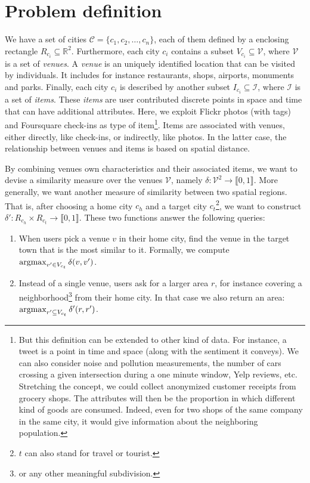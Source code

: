 \section{Problem definition}
\label{sec:problem}

We have a set of cities $\mathcal{C} =
\{c_1, c_2, \ldots, c_n\}$, each of them defined by a enclosing rectangle
$R_{c_i} \subseteq \mathbb{R}^2$. Furthermore, each city $c_i$ contains a
subset $V_{c_i} \subseteq \mathcal{V}$, where $\mathcal{V}$ is a set of
\emph{venues}. A \emph{venue} is an uniquely identified location that can be
visited by individuals. It includes for instance restaurants, shops, airports,
monuments and parks. Finally, each city $c_i$ is described by another subset
$I_{c_i} \subseteq \mathcal{I}$, where $\mathcal{I}$ is a set of \emph{items}.
These \emph{items} are user contributed discrete points in space and time that
can have additional attributes. Here, we exploit Flickr photos (with tags) and
Foursquare check-ins as type of item\footnote{But this definition can be
    extended to other kind of data. For instance, a tweet is a point in time
    and space (along with the sentiment it conveys). We can also consider
    noise and pollution measurements, the number of cars crossing a given
    intersection during a one minute window, Yelp reviews, etc. Stretching the
    concept, we could collect anonymized customer receipts from grocery shops.
    The attributes will then be the proportion in which different kind of
    goods are consumed. Indeed, even for two shops of the same company in the
    same city, it would give information about the neighboring population.}.
Items are associated with venues, either directly, like check-ins, or
indirectly, like photos. In the latter case, the relationship between venues
and items is based on spatial distance.

By combining venues own characteristics and their associated items, we want to
devise a similarity measure over the venues $\mathcal{V}$, namely $\delta:
\mathcal{V}^2 \rightarrow \llbracket 0, 1 \rrbracket $. More generally, we want
another measure of similarity between two spatial regions. That is, after
choosing a home city $c_h$ and a target city $c_t$\footnote{$t$ can also stand
for travel or tourist.}, we want to construct $\delta': R_{c_h} \times R_{c_t}
\rightarrow \llbracket 0, 1 \rrbracket$. These two functions answer the
following queries:

\begin{enumerate}
\item When users pick a venue $v$ in their home city, find the venue in the
	target town that is the most similar to it. Formally, we compute
	$\operatorname*{argmax}_{v' \in V_{c_t}} \delta(v, v')$.\label{q:point}
\item Instead of a single venue, users ask for a larger area $r$, for instance
	covering a neighborhood\footnote{or any other meaningful subdivision.}
	from their home city. In that case we also return an area:
	$\operatorname*{argmax}_{r' \subseteq V_{c_t}} \delta'(r, r')$.\label{q:space}
\end{enumerate}


